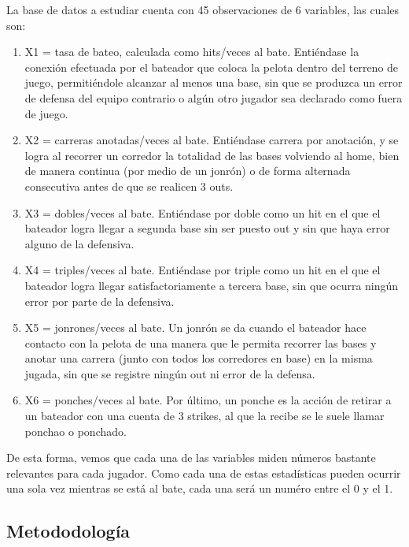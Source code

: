 \documentclass{staprojteamusb}
\begin{document}
 La base de datos a estudiar cuenta con 45 observaciones de 6 variables, las cuales son:

 \begin{enumerate}
   \item X1 = tasa de bateo, calculada como hits/veces al bate. Entiéndase la conexión efectuada por el bateador que coloca la pelota dentro del terreno de juego, permitiéndole alcanzar al menos una base, sin que se produzca un error de defensa del equipo contrario o algún otro jugador sea declarado como fuera de juego.
   \item X2 = carreras anotadas/veces al bate. Entiéndase carrera por anotación, y se logra al recorrer un corredor la totalidad de las bases volviendo al home, bien de manera continua (por medio de un jonrón) o de forma alternada consecutiva antes de que se realicen 3 outs.
   \item X3 = dobles/veces al bate. Entiéndase por doble como un hit en el que el bateador logra llegar a segunda base sin ser puesto out y sin que haya error alguno de la defensiva. 
   \item X4 = triples/veces al bate. Entiéndase por triple como un hit en el que el bateador logra llegar satisfactoriamente a tercera base, sin que ocurra ningún error por parte de la defensiva.
   \item X5 = jonrones/veces al bate. Un jonrón se da cuando el bateador hace contacto con la pelota de una manera que le permita recorrer las bases y anotar una carrera (junto con todos los corredores en base) en la misma jugada, sin que se registre ningún out ni error de la defensa.
   \item X6 = ponches/veces al bate. Por último, un ponche es la acción de retirar a un bateador con una cuenta de 3 strikes, al que la recibe se le suele llamar ponchao o ponchado.
 \end{enumerate}

 De esta forma, vemos que cada una de las variables miden números bastante relevantes para cada jugador. Como cada una de estas estadísticas pueden ocurrir una sola vez mientras se está al bate, cada una será un numéro entre el 0 y el 1.

 \hypertarget{metododologuxeda}{%
 \subsection{Metododología}\label{metododologuxeda}}
\end{document}
